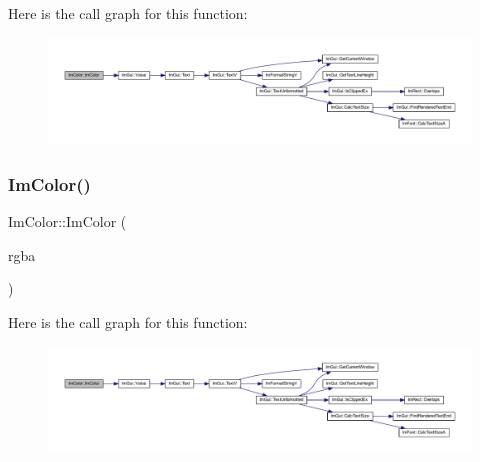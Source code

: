 Here is the call graph for this function\+:
\nopagebreak
\begin{figure}[H]
\begin{center}
\leavevmode
\includegraphics[width=350pt]{struct_im_color_ab4ba02f8290d5dadc1ebc57b2c8a9cbe_cgraph}
\end{center}
\end{figure}
\mbox{\label{struct_im_color_ad306332841a2b1f903f40262a19f9412}} 
\subsubsection{\texorpdfstring{Im\+Color()}{ImColor()}\hspace{0.1cm}{\footnotesize\ttfamily [3/5]}}
{\footnotesize\ttfamily Im\+Color\+::\+Im\+Color (\begin{DoxyParamCaption}\item[{\mbox{\hyperlink{imgui_8h_a118cff4eeb8d00e7d07ce3d6460eed36}{Im\+U32}}}]{rgba }\end{DoxyParamCaption})\hspace{0.3cm}{\ttfamily [inline]}}

Here is the call graph for this function\+:
\nopagebreak
\begin{figure}[H]
\begin{center}
\leavevmode
\includegraphics[width=350pt]{struct_im_color_ad306332841a2b1f903f40262a19f9412_cgraph}
\end{center}
\end{figure}
\mbox{\label{struct_im_color_a92b53917ca9d90a7207b18270ff5453d}} 
